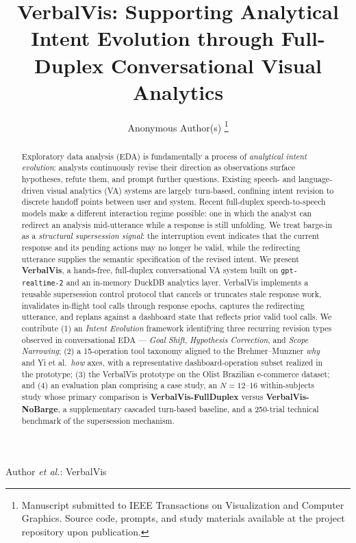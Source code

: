 \documentclass[journal]{IEEEtran}
\begin{document}
\title{VerbalVis: Supporting Analytical Intent Evolution through Full-Duplex Conversational Visual Analytics}

\author{Anonymous Author(s)%
\thanks{Manuscript submitted to IEEE Transactions on Visualization and Computer Graphics. Source code, prompts, and study materials available at the project repository upon publication.}}

%
{Author \MakeLowercase{\textit{et al.}}: VerbalVis}

\maketitle

\begin{abstract}
Exploratory data analysis (EDA) is fundamentally a process of \emph{analytical intent evolution}: analysts continuously revise their direction as observations surface hypotheses, refute them, and prompt further questions. Existing speech- and language-driven visual analytics (VA) systems are largely turn-based, confining intent revision to discrete handoff points between user and system. Recent full-duplex speech-to-speech models make a different interaction regime possible: one in which the analyst can redirect an analysis mid-utterance while a response is still unfolding. We treat barge-in as a \emph{structural supersession signal}: the interruption event indicates that the current response and its pending actions may no longer be valid, while the redirecting utterance supplies the semantic specification of the revised intent. We present \textbf{VerbalVis}, a hands-free, full-duplex conversational VA system built on \texttt{gpt-realtime-2} and an in-memory DuckDB analytics layer. VerbalVis implements a reusable supersession control protocol that cancels or truncates stale response work, invalidates in-flight tool calls through response epochs, captures the redirecting utterance, and replans against a dashboard state that reflects prior valid tool calls. We contribute (1) an \emph{Intent Evolution} framework identifying three recurring revision types observed in conversational EDA --- \emph{Goal Shift}, \emph{Hypothesis Correction}, and \emph{Scope Narrowing}; (2) a 15-operation tool taxonomy aligned to the Brehmer--Munzner \emph{why} and Yi et al.\ \emph{how} axes, with a representative dashboard-operation subset realized in the prototype; (3) the VerbalVis prototype on the Olist Brazilian e-commerce dataset; and (4) an evaluation plan comprising a case study, an $N{=}12$--$16$ within-subjects study whose primary comparison is \textbf{VerbalVis-FullDuplex} versus \textbf{VerbalVis-NoBarge}, a supplementary cascaded turn-based baseline, and a 250-trial technical benchmark of the supersession mechanism.
\end{abstract}
\end{document}
